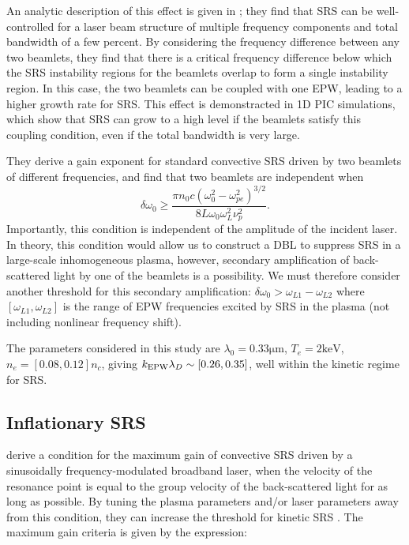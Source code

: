An analytic description of this effect is given in \citet{Zhao2019}; they find that SRS can be well-controlled for a laser beam structure of multiple frequency components and total bandwidth of a few
percent. By considering the frequency difference between any two beamlets, they find that
there is a critical frequency difference below which the SRS instability regions
for the beamlets overlap to form a single instability region. In this case, the
two beamlets can be coupled with one EPW, leading to a higher growth rate for
SRS. This effect is demonstracted in 1D PIC simulations, which show that SRS can grow to a high level if the beamlets satisfy this coupling condition, even if the total bandwidth is very large.

They derive a gain exponent for standard convective SRS driven by two
beamlets of different frequencies, and find that two beamlets are independent
when
\begin{equation}\label{DLB_threshold_inhomo}
\delta \omega_{0} \geq \frac{\pi n_{0} c\left(\omega_{0}^{2}-\omega_{p
e}^{2}\right)^{3 / 2}}{8 L \omega_{0} \omega_{L}^{2} \nu_{p}^{2}}.
\end{equation}
Importantly, this condition is independent of the amplitude of the incident
laser. In theory, this condition would allow us to construct a DBL to suppress
SRS in a large-scale inhomogeneous plasma, however, secondary amplification of
back-scattered light by one of the beamlets is a possibility. We must therefore
consider another threshold for this secondary amplification: $\delta\omega_0 >
\omega_{L1}-\omega_{L2}$ where $[\omega_{L1},\omega_{L2}]$ is the range of EPW
frequencies excited by SRS in the plasma (not including nonlinear frequency
shift).



The parameters considered in this study are
$\lambda_0=0.33\si{\micro\metre}$,
$T_e=2\si{\kilo\electronvolt}$, $n_e = [0.08,0.12]n_c$, giving $k_\mathrm{EPW}\lambda_D \sim
[0.26,0.35]$, well within the kinetic regime for SRS.

\subsection{Inflationary SRS}

\citet{Wen2021} derive a condition for the maximum gain of convective SRS driven by a sinusoidally frequency-modulated broadband laser, when the velocity of the resonance point is equal to the group velocity of the back-scattered light for as long as possible. By tuning the plasma parameters and/or laser parameters away from this condition, they can increase the threshold for kinetic SRS \citep{Wen2021}. The maximum gain criteria is given by the expression:

